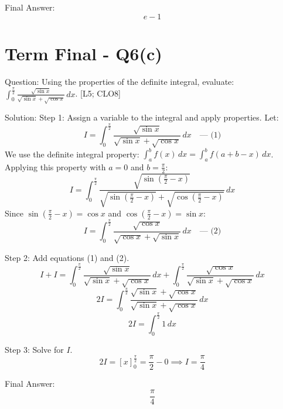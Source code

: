 \documentclass[11pt, a4paper]{article}
\begin{document}
Final Answer:
\[
\boxed{e - 1}
\]




\section*{Term Final - Q6(c)}

Question:
Using the properties of the definite integral, evaluate: $\int_{0}^{\frac{\pi}{2}} \frac{\sqrt{\sin x}}{\sqrt{\sin x} + \sqrt{\cos x}} \, dx$. [L5; CLO8]

Solution:
Step 1: Assign a variable to the integral and apply properties.
Let:
\[
I = \int_{0}^{\frac{\pi}{2}} \frac{\sqrt{\sin x}}{\sqrt{\sin x} + \sqrt{\cos x}} \, dx \quad \text{--- (1)}
\]
We use the definite integral property: $\int_{a}^{b} f(x) \, dx = \int_{a}^{b} f(a+b-x) \, dx$.
Applying this property with $a = 0$ and $b = \frac{\pi}{2}$:
\[
I = \int_{0}^{\frac{\pi}{2}} \frac{\sqrt{\sin(\frac{\pi}{2} - x)}}{\sqrt{\sin(\frac{\pi}{2} - x)} + \sqrt{\cos(\frac{\pi}{2} - x)}} \, dx
\]
Since $\sin(\frac{\pi}{2} - x) = \cos x$ and $\cos(\frac{\pi}{2} - x) = \sin x$:
\[
I = \int_{0}^{\frac{\pi}{2}} \frac{\sqrt{\cos x}}{\sqrt{\cos x} + \sqrt{\sin x}} \, dx \quad \text{--- (2)}
\]

Step 2: Add equations (1) and (2).
\[
I + I = \int_{0}^{\frac{\pi}{2}} \frac{\sqrt{\sin x}}{\sqrt{\sin x} + \sqrt{\cos x}} \, dx + \int_{0}^{\frac{\pi}{2}} \frac{\sqrt{\cos x}}{\sqrt{\sin x} + \sqrt{\cos x}} \, dx
\]
\[
2I = \int_{0}^{\frac{\pi}{2}} \frac{\sqrt{\sin x} + \sqrt{\cos x}}{\sqrt{\sin x} + \sqrt{\cos x}} \, dx
\]
\[
2I = \int_{0}^{\frac{\pi}{2}} 1 \, dx
\]

Step 3: Solve for $I$.
\[
2I = [x]_{0}^{\frac{\pi}{2}} = \frac{\pi}{2} - 0 \implies I = \frac{\pi}{4}
\]

Final Answer:
\[
\boxed{\frac{\pi}{4}}
\]

\end{document}
